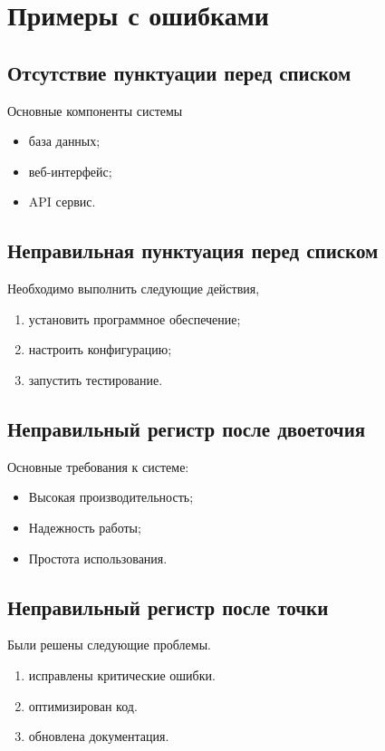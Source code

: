 \documentclass{article}
\begin{document}
\section{Примеры с ошибками}

\subsection{Отсутствие пунктуации перед списком}

Основные компоненты системы
\begin{itemize}
\item база данных;
\item веб-интерфейс;
\item API сервис.
\end{itemize}

\subsection{Неправильная пунктуация перед списком}

Необходимо выполнить следующие действия,
\begin{enumerate}
\item установить программное обеспечение;
\item настроить конфигурацию;
\item запустить тестирование.
\end{enumerate}

\subsection{Неправильный регистр после двоеточия}

Основные требования к системе:
\begin{itemize}
\item Высокая производительность;
\item Надежность работы;
\item Простота использования.
\end{itemize}

\subsection{Неправильный регистр после точки}

Были решены следующие проблемы.
\begin{enumerate}
\item исправлены критические ошибки.
\item оптимизирован код.
\item обновлена документация.
\end{enumerate}
\end{document}
